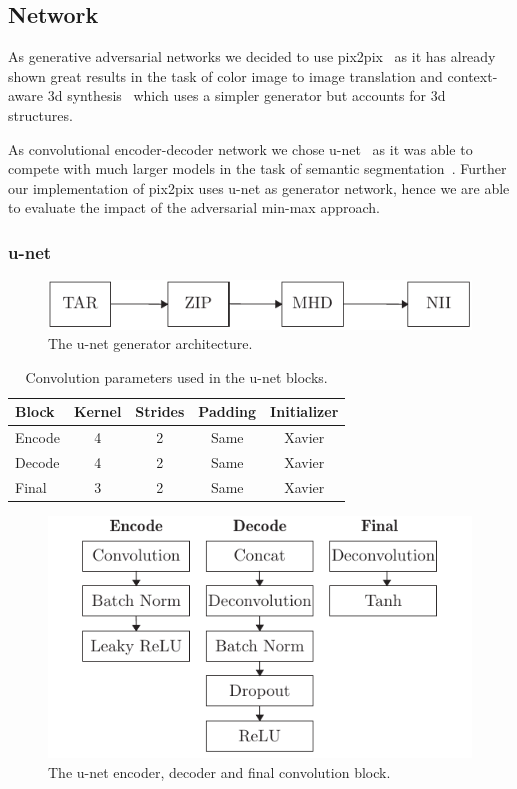 \subsection{Network}

As generative adversarial networks we decided to use pix2pix~\cite{Isola16}
as it has already shown great results in the task of color image to image
translation and context-aware 3d synthesis~\cite{Nie16} which uses a simpler
generator but accounts for 3d structures.

As convolutional encoder-decoder network we chose u-net~\cite{Ronneberger15}
as it was able to compete with much larger models in the task of semantic
segmentation~\cite{Badrinarayanan15}. Further our implementation of pix2pix
uses u-net as generator network, hence we are able to evaluate the impact
of the adversarial min-max approach.

\subsubsection{u-net}

\begin{figure}[h]
  \centering
  \includegraphics[width=\linewidth]{figure/unet-gen.pdf}
  \caption{The u-net generator architecture.
	}\label{fig:unet:gen}
\end{figure}
\begin{table}[h]
  \centering
  \begin{tabular}{lcccc}
    \toprule
    Block & Kernel & Strides & Padding & Initializer \\
    \midrule
    Encode & \num{4} & \num{2} & Same & Xavier \\
    Decode & \num{4} & \num{2} & Same & Xavier \\
    Final  & \num{3} & \num{2} & Same & Xavier \\
    \bottomrule
  \end{tabular}
  \caption{Convolution parameters used in the u-net blocks.
  }\label{tab:unet:conv}
\end{table}
\begin{figure}[h]
  \centering
  \includegraphics[width=\linewidth]{figure/unet-blocks.pdf}
  \caption{The u-net encoder, decoder and final convolution block.
	}\label{fig:unet:blocks}
\end{figure}

